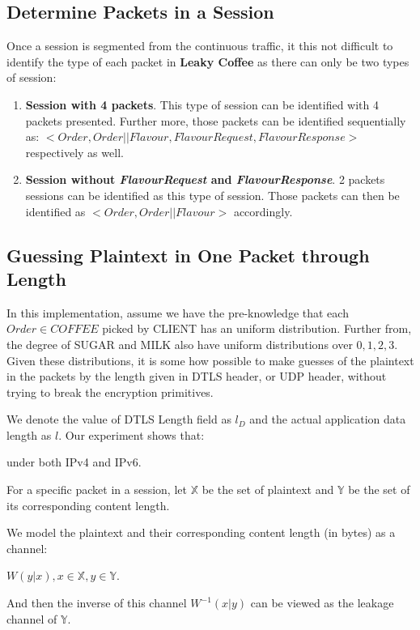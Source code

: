 \subsection{Determine Packets in a Session}
Once a session is segmented from the continuous traffic, it this not difficult to identify the type of each packet in \textbf{Leaky Coffee} as there can only be two types of session:
\begin{enumerate}
\item \textbf{Session with 4 packets}. This type of session can be identified with 4 packets presented. Further more, those packets can be identified sequentially as: $<Order, Order||Flavour, FlavourRequest, FlavourResponse>$ respectively as well.

\item \textbf{Session without \textit{FlavourRequest} and \textit{FlavourResponse}}. 2 packets sessions can be identified as this type of session. Those packets can then be identified as $<Order, Order||Flavour>$ accordingly.
\end{enumerate}
 
\subsection{Guessing Plaintext in  One Packet through Length} \label{Sec: Guessing Plaintext by One Packet Length}
In this implementation, assume we have the pre-knowledge that each $Order \in COFFEE$ picked by CLIENT has an uniform distribution. Further from, the degree of SUGAR and MILK also have uniform distributions over ${0,1,2,3}$. Given these distributions, it is some how possible to make guesses of the plaintext in the packets by the length given in DTLS header, or UDP header, without trying to break the encryption primitives.

We denote the value of DTLS Length field as $l_D$ and the actual application data length as $l$. Our experiment shows that:

under both IPv4 and IPv6.

\begin{definition}
For a specific packet in a session, let $\mathbb{X}$ be the set of plaintext and $\mathbb{Y}$ be the set of its corresponding content length.

 We model the plaintext  and their corresponding content length (in bytes) as a channel: 
 \begin{center}
 $W(y|x), x \in \mathbb{X}, y \in \mathbb{Y}$.
 \end{center}

And then the inverse of this channel $W^{-1}(x|y)$ can be viewed as the leakage channel of $\mathbb{Y}$.
\end{definition}


